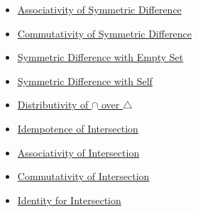 \begin{remark*}[Dependencies]
\begin{itemize}
  \item \hyperref[prop:symmdiff-assoc]{Associativity of Symmetric Difference}
  \item \hyperref[prop:symmdiff-comm]{Commutativity of Symmetric Difference}
  \item \hyperref[prop:symmdiff-empty]{Symmetric Difference with Empty Set}
  \item \hyperref[prop:symmdiff-self]{Symmetric Difference with Self}
  \item \hyperref[prop:cap-dist-symmdiff]{Distributivity of $\cap$ over $\triangle$}
  \item \hyperref[prop:idempotence-intersection]{Idempotence of Intersection}
  \item \hyperref[prop:assoc-intersection]{Associativity of Intersection}
  \item \hyperref[prop:comm-intersection]{Commutativity of Intersection}
  \item \hyperref[prop:identity-intersection]{Identity for Intersection}
\end{itemize}

\end{remark*}

